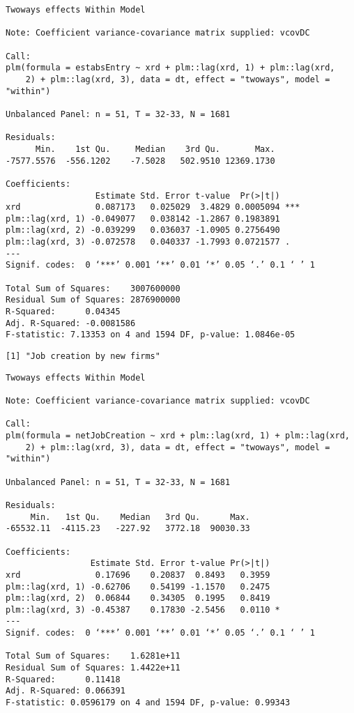 \documentclass[11pt]{article}
\begin{document}
    
    \begin{verbatim}
Twoways effects Within Model

Note: Coefficient variance-covariance matrix supplied: vcovDC

Call:
plm(formula = estabsEntry ~ xrd + plm::lag(xrd, 1) + plm::lag(xrd, 
    2) + plm::lag(xrd, 3), data = dt, effect = "twoways", model = "within")

Unbalanced Panel: n = 51, T = 32-33, N = 1681

Residuals:
      Min.    1st Qu.     Median    3rd Qu.       Max. 
-7577.5576  -556.1202    -7.5028   502.9510 12369.1730 

Coefficients:
                  Estimate Std. Error t-value  Pr(>|t|)    
xrd               0.087173   0.025029  3.4829 0.0005094 ***
plm::lag(xrd, 1) -0.049077   0.038142 -1.2867 0.1983891    
plm::lag(xrd, 2) -0.039299   0.036037 -1.0905 0.2756490    
plm::lag(xrd, 3) -0.072578   0.040337 -1.7993 0.0721577 .  
---
Signif. codes:  0 ‘***’ 0.001 ‘**’ 0.01 ‘*’ 0.05 ‘.’ 0.1 ‘ ’ 1

Total Sum of Squares:    3007600000
Residual Sum of Squares: 2876900000
R-Squared:      0.04345
Adj. R-Squared: -0.0081586
F-statistic: 7.13353 on 4 and 1594 DF, p-value: 1.0846e-05
    \end{verbatim}

    
    \begin{Verbatim}[commandchars=\\\{\}]
[1] "Job creation by new firms"

    \end{Verbatim}

    
    \begin{verbatim}
Twoways effects Within Model

Note: Coefficient variance-covariance matrix supplied: vcovDC

Call:
plm(formula = netJobCreation ~ xrd + plm::lag(xrd, 1) + plm::lag(xrd, 
    2) + plm::lag(xrd, 3), data = dt, effect = "twoways", model = "within")

Unbalanced Panel: n = 51, T = 32-33, N = 1681

Residuals:
     Min.   1st Qu.    Median   3rd Qu.      Max. 
-65532.11  -4115.23   -227.92   3772.18  90030.33 

Coefficients:
                 Estimate Std. Error t-value Pr(>|t|)  
xrd               0.17696    0.20837  0.8493   0.3959  
plm::lag(xrd, 1) -0.62706    0.54199 -1.1570   0.2475  
plm::lag(xrd, 2)  0.06844    0.34305  0.1995   0.8419  
plm::lag(xrd, 3) -0.45387    0.17830 -2.5456   0.0110 *
---
Signif. codes:  0 ‘***’ 0.001 ‘**’ 0.01 ‘*’ 0.05 ‘.’ 0.1 ‘ ’ 1

Total Sum of Squares:    1.6281e+11
Residual Sum of Squares: 1.4422e+11
R-Squared:      0.11418
Adj. R-Squared: 0.066391
F-statistic: 0.0596179 on 4 and 1594 DF, p-value: 0.99343
    \end{verbatim}
\end{document}

